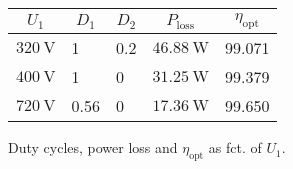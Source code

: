 
\begin{solutiontable}[ht]
    \centering  %
    \begin{tabular}{lllll}
        \toprule
        \multicolumn{1}{c}{$U_\mathrm{1}$} & \multicolumn{1}{c}{$D_1$} & 
        \multicolumn{1}{c}{$D_2$} & \multicolumn{1}{c}{$P_\mathrm{loss}$} & 
        \multicolumn{1}{c}{$\eta_\mathrm{opt}$} \\
        \midrule 
        $\SI{320}{\volt}$ & 1    & 0.2   & $\SI{46.88}{\watt}$ & 99.071 \\ 
        $\SI{400}{\volt}$ & 1    & 0     & $\SI{31.25}{\watt}$ & 99.379 \\ 
        $\SI{720}{\volt}$ & 0.56 & 0     & $\SI{17.36}{\watt}$ & 99.650 \\ 
        \bottomrule
    \end{tabular}
    \caption{Duty cycles, power loss and $\eta_\mathrm{opt}$ as fct. of $U_\mathrm{1}$.}
    \label{table:PowerlossDutyCycleEfficiencyOpt}  
\end{solutiontable}